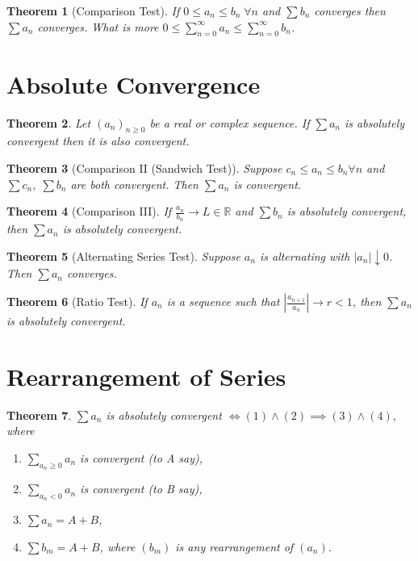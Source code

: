 \documentclass[11pt,a4paper]{article}
\newcommand\R{\mathbb{R}}
\newcommand\sumOfSeries{\sum_{n = 0}^{\infty}}
\newtheorem{theorem}{Theorem}
\theoremstyle{definition}
\begin{document}
\begin{theorem}[Comparison Test]
   If $ 0 \leq a_n \leq b_n \; \forall n $ and $ \sum b_n $ converges then $ \sum a_n $ converges. What is more $ 0 \leq \sumOfSeries a_n \leq \sumOfSeries b_n $.
\end{theorem}

\section{Absolute Convergence}

\begin{theorem}
    Let $ (a_n)_{n \geq 0} $ be a real or complex sequence. If $ \sum a_n $ is absolutely convergent then it is also convergent.
\end{theorem}

\begin{theorem}[Comparison II (Sandwich Test)]
   Suppose $ c_n \leq a_n \leq b_n \forall n $ and $ \sum c_n, \; \sum b_n $ are both convergent. Then $ \sum a_n $ is convergent. 
\end{theorem}

\begin{theorem}[Comparison III]
    If $ \frac{a_n}{b_n} \to L \in \R $ and $ \sum b_n $ is absolutely convergent, then $ \sum a_n $ is absolutely convergent.
\end{theorem}

\begin{theorem}[Alternating Series Test]
    Suppose $ a_n $ is alternating with $ |a_n| \downarrow 0 $. Then $ \sum a_n $ converges. 
\end{theorem}

\begin{theorem}[Ratio Test]
   If $ a_n $ is a sequence such that $ \left|\frac{a_{n + 1}}{a_n} \right| \to r < 1 $, then $ \sum a_n $ is absolutely convergent.
\end{theorem}

\section{Rearrangement of Series}

\begin{theorem}
    $ \sum a_n $ is absolutely convergent $ \iff (1) \land (2) \implies (3) \land (4), $ where
    \begin{enumerate}[(1)]
        \item $ \sum_{a_n \geq 0} a_n $ is convergent (to A say),
        \item $ \sum_{a_n < 0} a_n $ is convergent (to B say),
        \item $ \sum a_n = A + B $, 
        \item $ \sum b_m = A + B $, where $ (b_m) $ is any rearrangement of $ (a_n) $.
    \end{enumerate}
\end{theorem}
\end{document}
